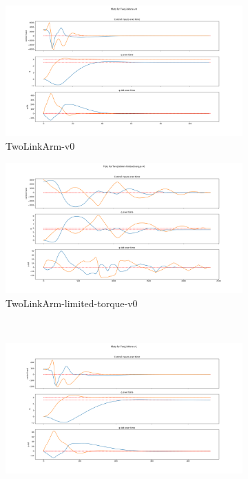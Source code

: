 \documentclass[hidelinks]{scrartcl}
\begin{document}
\begin{figure}[H]
	\centering
    \begin{subfigure}[b]{0.45\textwidth}
        \includegraphics[width=\textwidth]{figures/twolinkarm-v0}
        \caption{TwoLinkArm-v0}
    \end{subfigure}
    \begin{subfigure}[b]{0.45\textwidth}
        \includegraphics[width=\textwidth]{figures/twolinkarm-limited-v0}
        \caption{TwoLinkArm-limited-torque-v0}
    \end{subfigure}
    \\
     \begin{subfigure}[b]{0.45\textwidth}
        \includegraphics[width=\textwidth]{figures/twolinkarm-v1}

\end{subfigure}
\end{figure}
\end{document}
